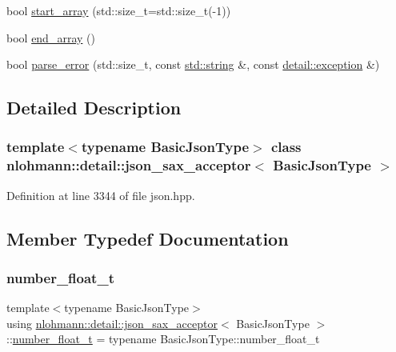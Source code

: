 \begin{DoxyCompactItemize}
bool \mbox{\hyperlink{classnlohmann_1_1detail_1_1json__sax__acceptor_a8238e8090cbb4ed8a22cbc97bfb833a5}{start\+\_\+array}} (std\+::size\+\_\+t=std\+::size\+\_\+t(-\/1))
\item 
bool \mbox{\hyperlink{classnlohmann_1_1detail_1_1json__sax__acceptor_a22ef94ca5476a9563dcaca15b7d6e654}{end\+\_\+array}} ()
\item 
bool \mbox{\hyperlink{classnlohmann_1_1detail_1_1json__sax__acceptor_a95bb3e8b6feaa523ecda8106fb5e38e3}{parse\+\_\+error}} (std\+::size\+\_\+t, const \mbox{\hyperlink{namespacenlohmann_1_1detail_a1ed8fc6239da25abcaf681d30ace4985ab45cffe084dd3d20d928bee85e7b0f21}{std\+::string}} \&, const \mbox{\hyperlink{classnlohmann_1_1detail_1_1exception}{detail\+::exception}} \&)
\end{DoxyCompactItemize}


\subsection{Detailed Description}
\subsubsection*{template$<$typename Basic\+Json\+Type$>$\newline
class nlohmann\+::detail\+::json\+\_\+sax\+\_\+acceptor$<$ Basic\+Json\+Type $>$}



Definition at line 3344 of file json.\+hpp.



\subsection{Member Typedef Documentation}
\mbox{\label{classnlohmann_1_1detail_1_1json__sax__acceptor_a5502f483fc60a1bcd73e0e46b6ab36e4}} 
\subsubsection{\texorpdfstring{number\_float\_t}{number\_float\_t}}
{\footnotesize\ttfamily template$<$typename Basic\+Json\+Type$>$ \\
using \mbox{\hyperlink{classnlohmann_1_1detail_1_1json__sax__acceptor}{nlohmann\+::detail\+::json\+\_\+sax\+\_\+acceptor}}$<$ Basic\+Json\+Type $>$\+::\mbox{\hyperlink{classnlohmann_1_1detail_1_1json__sax__acceptor_a5502f483fc60a1bcd73e0e46b6ab36e4}{number\+\_\+float\+\_\+t}} =  typename Basic\+Json\+Type\+::number\+\_\+float\+\_\+t}



